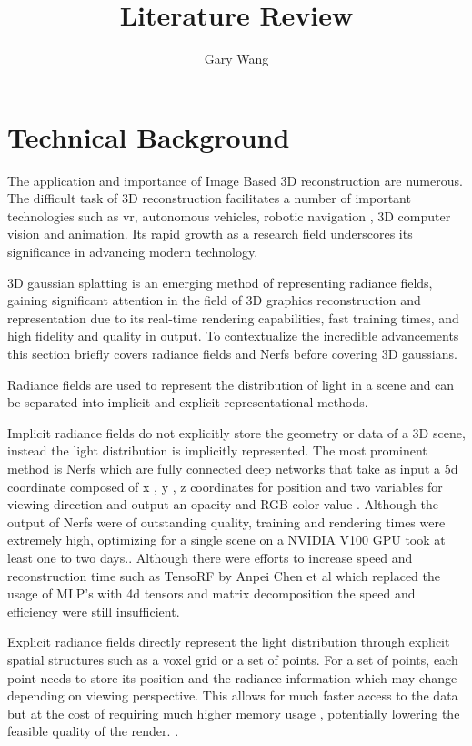 \documentclass[10pt,twocolumn]{article}
\title{Literature Review}
\author{Gary Wang}
\affiliation{Occidental College}
\begin{document}
\maketitle




\section{Technical Background}

The application and importance of Image Based 3D reconstruction are numerous. The difficult task of 3D reconstruction facilitates a number of important technologies such as vr, autonomous vehicles, robotic navigation , 3D computer vision and animation. Its rapid growth as a research field underscores its significance in advancing modern technology.

3D gaussian splatting is an emerging method of representing radiance fields, gaining significant attention in the field of 3D graphics reconstruction and representation due to its real-time rendering capabilities, fast training times, and high fidelity and quality in output. To contextualize the incredible advancements this section briefly covers radiance fields and Nerfs before covering 3D gaussians.

Radiance fields are used to represent the distribution of light in a scene and can be separated into implicit and explicit representational methods\cite{chen2025survey3dgaussiansplatting}. 

Implicit radiance fields do not explicitly store the geometry or data of a 3D scene, instead the light distribution is implicitly represented. The most prominent method is Nerfs which are fully connected deep networks that take as input a 5d coordinate composed of x , y , z coordinates for position and two variables for viewing direction and output an opacity and RGB color value \cite{mildenhall2020nerfrepresentingscenesneural}. Although the output of Nerfs were of outstanding quality, training and rendering times were extremely high, optimizing for a single scene on a NVIDIA V100 GPU took at least one to two days.\cite{mildenhall2020nerfrepresentingscenesneural}. Although there were efforts to increase speed and reconstruction time such as TensoRF by Anpei Chen et al \cite{chen2022tensorftensorialradiancefields} which replaced the usage of MLP's with 4d tensors and matrix decomposition the speed and efficiency were still insufficient.

Explicit radiance fields directly represent the light distribution through explicit spatial structures such as a voxel grid or a set of points. For a set of points, each point needs to store its position and the radiance information which may change depending on viewing perspective. This allows for much faster access to the data but at the cost of requiring much higher memory usage , potentially lowering the feasible quality of the render. \cite{chen2025survey3dgaussiansplatting}.
\end{document}
